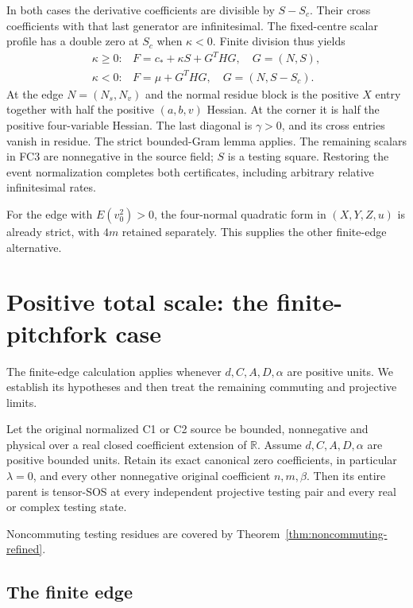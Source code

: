 In both cases the derivative coefficients are divisible by $S-S_c$.
Their cross coefficients with that last generator are infinitesimal.
The fixed-centre scalar profile has a double zero at $S_c$ when
$\kappa<0$. Finite division thus yields
\[
 \begin{array}{ll}
 \kappa\ge0:&F=c_*+\kappa S+G^THG,\quad G=(N,S),\\
 \kappa<0:&F=\mu+G^THG,\quad G=(N,S-S_c).
 \end{array}
 \tag{FC3}
\]
At the edge $N=(N_s,N_v)$ and the normal residue block is the
positive $X$ entry together with half the positive $(a,b,v)$
Hessian. At the corner it is half the positive four-variable
Hessian. The last diagonal is $\gamma>0$, and its cross entries
vanish in residue. The strict bounded-Gram lemma applies.
The remaining scalars in FC3 are nonnegative in the source field;
$S$ is a testing square. Restoring the event normalization completes
both certificates, including arbitrary relative infinitesimal rates.

For the edge with $E(v_0^2)>0$, the four-normal quadratic form in
$(X,Y,Z,u)$ is already strict, with $4m$ retained separately.
This supplies the other finite-edge alternative.


\section{\texorpdfstring{Positive total scale: the finite-pitchfork case}{Positive total scale: the finite-pitchfork case}}
\label{component:pfb0cf454f653}


The finite-edge calculation applies whenever $d,C,A,D,\alpha$
are positive units. We establish its hypotheses and then treat the
remaining commuting and projective limits.

\begin{theorem}
Let the original normalized C1 or C2 source be bounded, nonnegative and
physical over a real closed coefficient extension of $\mathbb R$.
Assume $d,C,A,D,\alpha$ are positive bounded units. Retain its exact
canonical zero coefficients, in particular $\lambda=0$, and every
other nonnegative original coefficient $n,m,\beta$. Then its entire
parent is tensor-SOS at every independent projective testing pair and
every real or complex testing state.
\end{theorem}

Noncommuting testing residues are covered by
Theorem~\ref{thm:noncommuting-refined}.

\subsection*{The finite edge}

